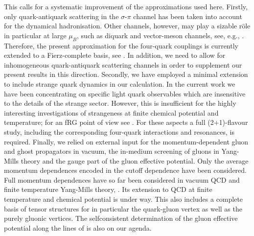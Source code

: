 \documentclass[%
reprint,
superscriptaddress,
showpacs,preprintnumbers,
 amsmath,amssymb,
 aps,
prd,
]{revtex4-1}
\begin{document}
This calls for a systematic improvement of the approximations used
here. Firstly, only quark-antiquark scattering in the $\sigma$-$\pi$
channel has been taken into account for the dynamical
hadronisation. Other channels, however, may play a sizable
r$\hat{\textrm{o}}$le in particular at large $\mu_B$, such as diquark
and vector-meson channels, see, e.g., \cite{Braun:2017srn,
  Braun:2018bik}. Therefore, the present approximation for the
four-quark couplings is currently extended to a Fierz-complete basis,
see \cite{Mitter:2014wpa, Braun:2017srn, Braun:2018bik,
  Cyrol:2017ewj}. In addition, we need to allow for inhomogeneous
quark-antiquark scattering channels in order to supplement our present
results in this direction. Secondly, we have employed a minimal
extension to include strange quark dynamics in our calculation. In the
current work we have been concentrating on specific light quark
observables which are insensitive to the details of the strange
sector. However, this is insufficient for the highly interesting
investigations of strangeness at finite chemical potential and
temperature; for an fRG point of view see \cite{Fu:2018qsk,
  Fu:2018swz}. For these aspects a full (2+1)-flavour study, including
the corresponding four-quark interactions and resonances, is
required. Finally, we relied on external input for the
momentum-dependent gluon and ghost propagators in vacuum, the
in-medium screening of gluons in Yang-Mills theory and the gauge part
of the gluon effective potential.  Only the average momentum
dependences encoded in the cutoff dependence have been
considered. Full momentum dependences have so far been considered in
vacuum QCD and finite temperature Yang-Mills theory,
\cite{Mitter:2014wpa, Braun:2014ata, Cyrol:2016tym, Cyrol:2017ewj,
  Cyrol:2017qkl}.  Its extension to QCD at finite temperature and
chemical potential is under way. This also includes a complete basis
of tensor structures for in particular the quark-gluon vertex as well
as the purely gluonic vertices. The selfconsistent determination of
the gluon effective potential along the lines of \cite{Braun:2007bx}
is also on our agenda.
\end{document}
